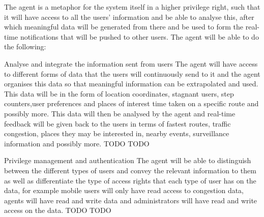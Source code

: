 The agent is a metaphor for the system itself in a higher privilege right, such that it will have access to all the users' information and be able to analyse this, after which meaningful data will be generated from there and be used to form the real-time notifications that will be pushed to other users. The agent will be able to do the following:
\\
\bigskip

\FuncReq
{Analyse and integrate the information sent from users}
{The agent will have access to different forms of data that the users will continuously send to it and the agent organises this data so that meaningful information can be extrapolated and used. This data will be in the form of location coordinates, stagnant users, step counters,user preferences and places of interest time taken on a specific route and possibly more. This data will then be analysed by the agent and real-time feedback will be given back to the users in terms of fastest routes, traffic congestion, places they may be interested in, nearby events, surveillance information and possibly more.}
{TODO}
{TODO}

\FuncReq
{Privilege management and authentication}
{The agent will be able to distinguish between the different types of users and convey the relevant information to them as well as differentiate the type of access rights that each type of user has on the data, for example mobile users will only have read access to congestion data, agents will have read and write data and administrators will have read and write access on the data.}
{TODO}
{TODO}